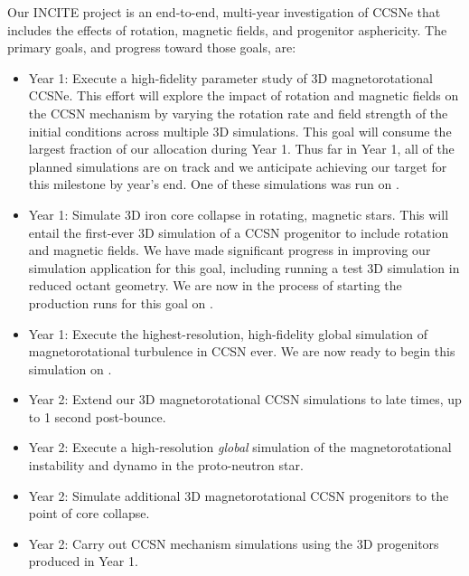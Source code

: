 \documentclass[12pt,letterpaper]{article}
\begin{document}
\begin{flushleft}
{Our INCITE project is an end-to-end, multi-year investigation of CCSNe that includes the effects of rotation, magnetic fields, and progenitor asphericity.
The primary goals, and progress toward those goals, are:
\begin{itemize}
  \item Year 1: Execute a high-fidelity parameter study of 3D magnetorotational CCSNe. This effort will explore the impact of rotation and magnetic fields on the CCSN mechanism by varying the rotation rate and field strength of the initial conditions across multiple 3D simulations. This goal will consume the largest fraction of our allocation during Year 1. Thus far in Year 1, all of the planned simulations are on track and we anticipate achieving our target for this milestone by year's end. One of these simulations was run on \thet.
  \item Year 1: Simulate 3D iron core collapse in rotating, magnetic stars. This will entail the first-ever 3D simulation of a CCSN progenitor to include rotation and magnetic fields. We have made significant progress in improving our simulation application for this goal, including running a test 3D simulation in reduced octant geometry. We are now in the process of starting the production runs for this goal on \mira.
  \item Year 1: Execute the highest-resolution, high-fidelity global simulation of magnetorotational turbulence in CCSN ever. We are now ready to begin this simulation on \mira.
  \item Year 2: Extend our 3D magnetorotational CCSN simulations to late times, up to 1 second post-bounce. 
  \item Year 2: Execute a high-resolution {\it global} simulation of the magnetorotational instability and dynamo in the proto-neutron star. 
  \item Year 2: Simulate additional 3D magnetorotational CCSN progenitors to the point of core collapse.
  \item Year 2: Carry out CCSN mechanism simulations using the 3D progenitors produced in Year 1.
\end{itemize}

}
\end{flushleft}
\end{document}
